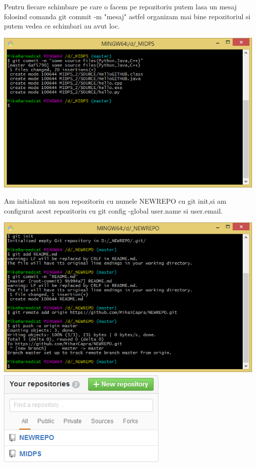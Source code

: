 Pentru fiecare schimbare pe care o facem pe repozitoriu putem lasa un mesaj folosind comanda git commit -m "mesaj" astfel organizam mai bine repozitoriul si putem vedea  ce schimbari au avut loc.
\begin{center}
\includegraphics[scale=0.7]{images/git_commit}
\end{center}
Am initializat un nou repozitoriu cu numele NEWREPO cu git init,si am configurat acest repozitoriu cu git config \--global user.name si user.email.
\begin{center}
\includegraphics[scale=0.7]{images/git_init}\\
\includegraphics[scale=0.7]{images/repos}\\
\end{center}
